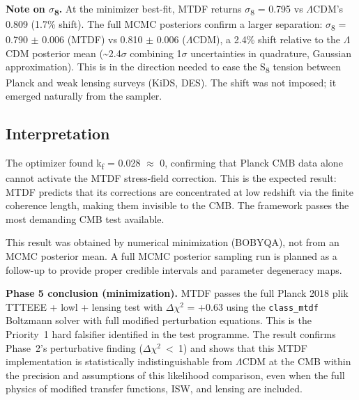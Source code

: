 \documentclass[11pt,a4paper]{article}
\begin{document}
\begin{mdframed}[linecolor=accent,linewidth=0.5pt,backgroundcolor=callout-bg,leftline=true,rightline=true,topline=true,bottomline=true,innerleftmargin=8pt,innerrightmargin=8pt,innertopmargin=6pt,innerbottommargin=6pt]
\textbf{Note on $\sigma$\textsubscript{8}.}
At the minimizer best-fit, MTDF returns $\sigma$\textsubscript{8} = 0.795 vs $\Lambda$CDM's 0.809 (1.7\% shift). The full MCMC posteriors confirm a larger separation: $\sigma$\textsubscript{8} = 0.790 $\pm$ 0.006 (MTDF) vs 0.810 $\pm$ 0.006 ($\Lambda$CDM), a 2.4\% shift relative to the $\Lambda$CDM posterior mean (\~{}2.4$\sigma$ combining 1$\sigma$ uncertainties in quadrature, Gaussian approximation). This is in the direction needed to ease the S\textsubscript{8} tension between Planck and weak lensing surveys (KiDS, DES). The shift was not imposed; it emerged naturally from the sampler.
\end{mdframed}

\subsection{Interpretation}
The optimizer found k\textsubscript{f} = 0.028 $\approx$ 0, confirming that Planck CMB data alone cannot activate the MTDF stress-field correction. This is the expected result: MTDF predicts that its corrections are concentrated at low redshift via the finite coherence length, making them invisible to the CMB. The framework passes the most demanding CMB test available.

This result was obtained by numerical minimization (BOBYQA), not from an MCMC posterior mean. A full MCMC posterior sampling run is planned as a follow-up to provide proper credible intervals and parameter degeneracy maps.

\begin{mdframed}[linecolor=accent,linewidth=0.5pt,backgroundcolor=callout-bg,leftline=true,rightline=true,topline=true,bottomline=true,innerleftmargin=8pt,innerrightmargin=8pt,innertopmargin=6pt,innerbottommargin=6pt]
\textbf{Phase 5 conclusion (minimization).}
MTDF passes the full Planck 2018 plik TTTEEE + lowl + lensing test with $\Delta$$\chi$$^{2}$ = +0.63 using the \texttt{class\_\allowbreak{}mtdf} Boltzmann solver with full modified perturbation equations. This is the Priority~1 hard falsifier identified in the test programme. The result confirms Phase~2's perturbative finding ($\Delta$$\chi$$^{2}$~<~1) and shows that this MTDF implementation is statistically indistinguishable from $\Lambda$CDM at the CMB within the precision and assumptions of this likelihood comparison, even when the full physics of modified transfer functions, ISW, and lensing are included.
\end{mdframed}
\end{document}

